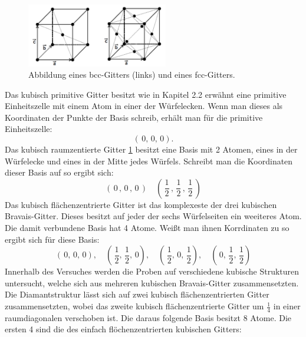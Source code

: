 \begin{figure}
    \centering
    \includegraphics[width=0.55\textwidth]{ressources/kubies.png}
    \caption{Abbildung eines bcc-Gitters (links) und eines fcc-Gitters\cite{skript}.}
    \label{bcc}
\end{figure}

Das kubisch primitive Gitter besitzt wie in Kapitel 2.2 erwähnt eine
primitive Einheitszelle mit einem Atom in einer der Würfelecken.
Wenn man dieses als Koordinaten der Punkte der Basis
schreib, erhält man für die primitive Einheitszelle:
$$ (\,0,\,0,\,0).$$
Das kubisch raumzentierte Gitter \ref{bcc} besitzt eine Basis mit 2 Atomen,
eines in der Würfelecke und eines in der Mitte jedes Würfels. Schreibt man
die Koordinaten dieser Basis auf so ergibt sich:
$$(\,0\,,\,0\,,\,0\,) \quad (\,\frac{1}{2}\,, \,\frac{1}{2}\, ,\, \frac{1}{2}\,)$$
Das kubisch flächenzentrierte Gitter ist das komplexeste der drei kubischen Bravais-Gitter.
Dieses besitzt auf jeder der sechs Würfelseiten ein weeiteres Atom. Die damit
verbundene Basis hat 4 Atome. Weißt man ihnen Korrdinaten zu so ergibt sich
für diese Basis:
$$(\,0,\,0,\,0), \quad (\,\frac{1}{2},\, \frac{1}{2} ,\, 0), \quad (\, \frac{1}{2}, \,0 ,\, \frac{1}{2}),
\quad (\,0, \, \frac{1}{2} , \, \frac{1}{2})$$
Innerhalb des Versuches werden die Proben auf verschiedene kubische Strukturen
untersucht, welche sich aus mehreren kubischen Bravais-Gitter zusammensetzten.
Die Diamantstruktur lässt sich auf zwei kubisch flächenzentrierten Gitter
zusammensetzten, wobei das zweite kubisch flächenzentrierte Gitter um
$\frac{1}{4}$ in einer raumdiagonalen verschoben ist. Die daraus folgende
Basis besitzt 8 Atome. Die ersten 4 sind die des einfach flöchenzentrierten
kubischen Gitters:

